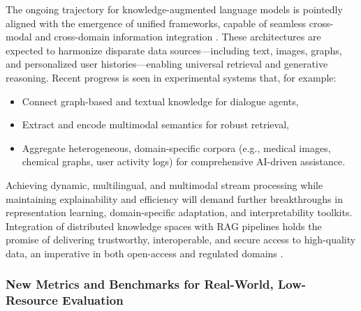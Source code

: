 The ongoing trajectory for knowledge-augmented language models is pointedly aligned with the emergence of unified frameworks, capable of seamless cross-modal and cross-domain information integration \cite{ref61,ref62,ref63,ref64}. These architectures are expected to harmonize disparate data sources—including text, images, graphs, and personalized user histories—enabling universal retrieval and generative reasoning. Recent progress is seen in experimental systems that, for example:
\begin{itemize}
    \item Connect graph-based and textual knowledge for dialogue agents,
    \item Extract and encode multimodal semantics for robust retrieval,
    \item Aggregate heterogeneous, domain-specific corpora (e.g., medical images, chemical graphs, user activity logs) for comprehensive AI-driven assistance.
\end{itemize}
\cite{ref5,ref14,ref23,ref29,ref36,ref43,ref54}

Achieving dynamic, multilingual, and multimodal stream processing while maintaining explainability and efficiency will demand further breakthroughs in representation learning, domain-specific adaptation, and interpretability toolkits. Integration of distributed knowledge spaces with RAG pipelines holds the promise of delivering trustworthy, interoperable, and secure access to high-quality data, an imperative in both open-access and regulated domains \cite{ref62}.

\subsubsection{New Metrics and Benchmarks for Real-World, Low-Resource Evaluation}

